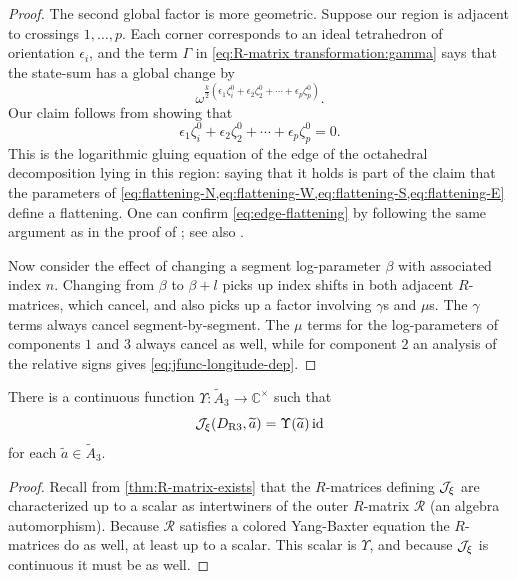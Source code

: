 \documentclass{sl2ams}
\numberwithin{equation}{section}
\newcommand{\CC}{\mathbb{C}}
\newcommand{\R}{\mathcal{R}}
\begin{document}
\begin{proof}
  The second global factor is more geometric.
  Suppose our region is adjacent to crossings \(1, \dots, p\).
  Each corner corresponds to an ideal tetrahedron of orientation \(\epsilon_i\), and the term \(\Gamma\) in \cref{eq:R-matrix transformation:gamma} says that the state-sum has a global change by
  \[
    \omega^{\frac{k}{2}( \epsilon_{1} \zeta_i^0 + \epsilon_2 \zeta_2^0 + \cdots  + \epsilon_p \zeta_p^0)}.
  \]
  Our claim follows from showing that
  \begin{equation}
    \label{eq:edge-flattening}
    \epsilon_{1} \zeta_i^0 + \epsilon_2 \zeta_2^0 + \cdots  + \epsilon_p \zeta_p^0 = 0.
  \end{equation}
  This is the logarithmic gluing equation of the edge of the octahedral decomposition lying in this region: saying that it holds is part of the claim that the parameters of \cref{eq:flattening-N,eq:flattening-W,eq:flattening-S,eq:flattening-E} define a flattening.
  One can confirm \eqref{eq:edge-flattening} by following the same argument as in the proof of \cite[Theorem 3.2]{McPhailSnyder2022}; see also \cite[Figure 13]{McPhailSnyder2022}.%

  Now consider the effect of changing a segment log-parameter \(\beta\) with associated index \(n\).
  Changing from \(\beta\) to \(\beta + l\) picks up index shifts in both adjacent \(R\)-matrices, which cancel, and also picks up a factor involving \(\gamma\)s and \(\mu\)s.
  The  \(\gamma\) terms always cancel segment-by-segment.
  The \(\mu\) terms for the log-parameters of components \(1\) and \(3\) always cancel as well, while for component \(2\) an analysis of the relative signs gives \cref{eq:jfunc-longitude-dep}.
\end{proof}

\begin{lemma}
  \label{thm:scalar-lemma}
  There is a continuous function \(\Upsilon : \widetilde A_3 \to \CC^{\times}\) such that
  \begin{equation}
    \label{eq:Upsilon-def}
    \jfunc(D_{\RIII}, \widetilde a) = \Upsilon(\widetilde a) \id
  \end{equation}
  for each \(\widetilde a \in \widetilde A_3\).
\end{lemma}
\begin{proof}
  Recall from \cref{thm:R-matrix-exists} that the \(R\)-matrices  defining \(\jfunc\) are characterized up to a scalar as intertwiners of the outer \(R\)-matrix \(\R\) (an algebra automorphism).
  Because \(\R\) satisfies a colored Yang-Baxter equation the \(R\)-matrices do as well, at least up to a scalar.
  This scalar is \(\Upsilon\), and because \(\jfunc\) is continuous it must be as well.
\end{proof}
\end{document}
